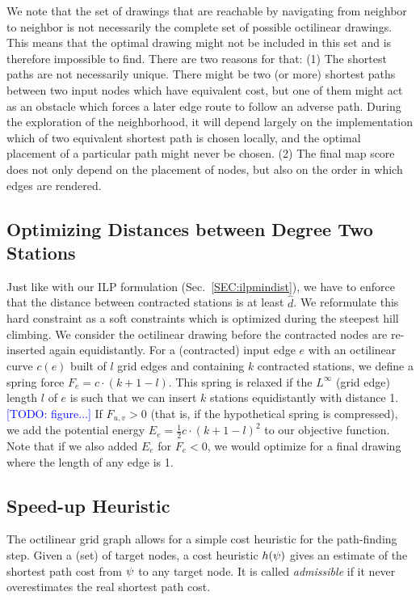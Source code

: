 \documentclass[sigconf]{acmart}
\newcommand\TODO[1]{\textcolor{blue}{\small [TODO: #1]}}
\begin{document}
We note that the set of drawings that are reachable by navigating from neighbor to neighbor is not necessarily the complete set of possible octilinear drawings.
This means that the optimal drawing might not be included in this set and is therefore impossible to find.
There are two reasons for that: 
(1) The shortest paths are not necessarily unique.
There might be two (or more) shortest paths between two input nodes which have equivalent cost, but one of them might act as an obstacle which forces a later edge route to follow an adverse path.
During the exploration of the neighborhood, it will depend largely on the implementation which of two equivalent shortest path is chosen locally, and the optimal placement of a particular path might never be chosen.
(2) The final map score does not only depend on the placement of nodes, but also on the order in which edges are rendered.

\subsection{Optimizing Distances between Degree Two Stations}

Just like with our ILP formulation (Sec.~\ref{SEC:ilpmindist}), we have to enforce that the distance between contracted stations is at least $\hat d$. 
We reformulate this hard constraint as a soft constraints which is optimized during the steepest hill climbing.
We consider the octilinear drawing before the contracted nodes are re-inserted again equidistantly.
For a (contracted) input edge $e$ with an octilinear curve $c(e)$ built of $l$ grid edges and containing $k$ contracted stations, we define a spring force $F_e = c \cdot (k + 1 - l)$.
This spring is relaxed if the $L^\infty$ (grid edge) length $l$ of $e$ is such that we can insert $k$ stations equidistantly with distance 1. \TODO{figure...}
If $F_{u, v} > 0$ (that is, if the hypothetical spring is compressed), we add the potential energy $E_e = \frac{1}{2} c \cdot (k + 1 - l)^2$ to our objective function.
Note that if we also added $E_e$ for $F_e < 0$, we would optimize for a final drawing where the length of any edge is 1.

\subsection{Speed-up Heuristic}

The octilinear grid graph allows for a simple cost heuristic for the path-finding step.
Given a (set) of target nodes, a cost heuristic $h(\psi)$ gives an estimate of the shortest path cost from $\psi$ to any target node.
It is called \emph{admissible} if it never overestimates the real shortest path cost.
\end{document}
